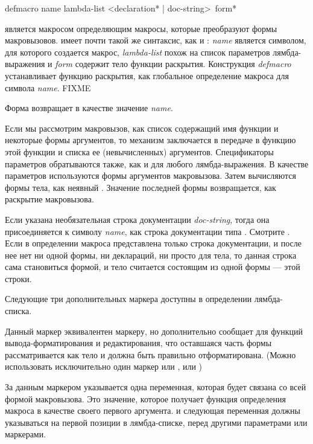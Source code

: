 \begin{defmac}
defmacro name lambda-list <{declaration}* | doc-string> {\,form}*

 является макросом определяющим макросы, которые преобразуют формы
макровызовов.
 имеет почти такой же синтаксис, как и :
\emph{name} является символом, для которого создается макрос,
\emph{lambda-list} похож на список параметров лямбда-выражения и 
\emph{form} содержит тело функции раскрытия.
Конструкция \emph{defmacro} устанавливает функцию раскрытия, как глобальное
определение макроса для символа \emph{name}.
FIXME

Форма  возвращает в качестве значение \emph{name}.

Если мы рассмотрим макровызов, как список содержащий имя функции и некоторые
формы аргументов, то механизм заключается в передаче в функцию  этой
функции и списка ее (невычисленных) аргументов.
Спецификаторы параметров обратываются также, как и для любого лямбда-выражения.
В качестве параметров используются формы аргументов макровызова.
Затем вычисляются формы тела, как неявный . Значение последней формы
возвращается, как раскрытие макровызова.

Если указана необязательная строка документации \emph{doc-string}, тогда она
присоединяется к символу \emph{name}, как строка документации типа
. Смотрите .
Если в определении макроса представлена только строка документации, и после нее
нет ни одной формы, ни деклараций, ни просто для тела, то данная строка сама
становиться формой, и тело считается состоящим из одной формы --- этой строки.

Следующие три дополнительных маркера доступны в определении лямбда-списка.
\begin{indentdesc}{6pc}
\item[\cd{\&body}]

Данный маркер эквивалентен  маркеру, но дополнительно сообщает для
функций вывода-форматирования и редактирования, что оставшаяся часть формы
рассматривается как тело и должна быть правильно отформатирована.
(Можно использовать исключительно один маркер или , или )

\item[\cd{\&whole}]
За данным маркером указывается одна переменная, которая будет связана со всей
формой макровызова. Это значение, которое получает функция определения макроса в
качестве своего первого аргумента.
 и следующая переменная должны указываться на первой позиции в
лямбда-списке, перед другими параметрами или маркерами.


\end{indentdesc}
\end{defmac}
